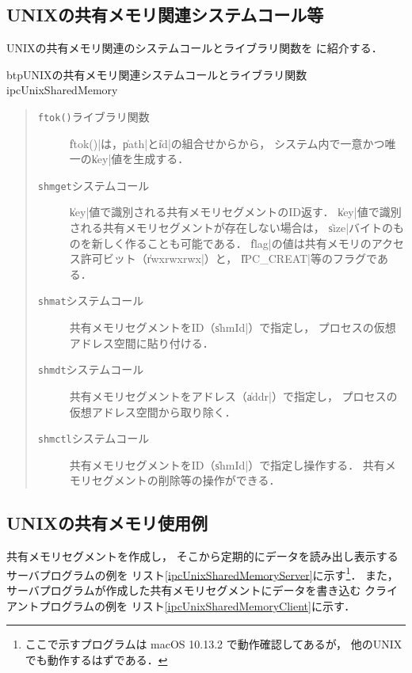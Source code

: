 \subsection{UNIXの共有メモリ関連システムコール等}
UNIXの共有メモリ関連のシステムコールとライブラリ関数を
に紹介する．

\begin{myfig}{btp}{UNIXの共有メモリ関連システムコールとライブラリ関数}
  {ipcUnixSharedMemory}
  
\end{myfig}

\begin{quote}
  \begin{description}
  \item [\texttt{ftok()}ライブラリ関数]
    \|ftok()|は，\|path|と\|id|の組合せからから，
    システム内で一意かつ唯一の\|key|値を生成する．

  \item [\texttt{shmget}システムコール]
    \|key|値で識別される共有メモリセグメントのID返す．
    \|key|値で識別される共有メモリセグメントが存在しない場合は，
    \|size|バイトのものを新しく作ることも可能である．
    \|flag|の値は共有メモリのアクセス許可ビット（\|rwxrwxrwx|）と，
    \|IPC_CREAT|等のフラグである．

  \item [\texttt{shmat}システムコール]
    共有メモリセグメントをID（\|shmId|）で指定し，
    プロセスの仮想アドレス空間に貼り付ける．

  \item [\texttt{shmdt}システムコール]
    共有メモリセグメントをアドレス（\|addr|）で指定し，
    プロセスの仮想アドレス空間から取り除く．

  \item [\texttt{shmctl}システムコール]
    共有メモリセグメントをID（\|shmId|）で指定し操作する．
    共有メモリセグメントの削除等の操作ができる．
  \end{description}
\end{quote}

\subsection{UNIXの共有メモリ使用例}
共有メモリセグメントを作成し，
そこから定期的にデータを読み出し表示するサーバプログラムの例を
リスト\ref{ipcUnixSharedMemoryServer}に示す\footnote{
  ここで示すプログラムは macOS 10.13.2 で動作確認してあるが，
  他のUNIXでも動作するはずである．}．
また，サーバプログラムが作成した共有メモリセグメントにデータを書き込む
クライアントプログラムの例を
リスト\ref{ipcUnixSharedMemoryClient}に示す．


